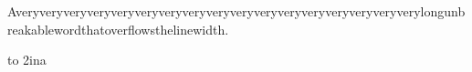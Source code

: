 \documentclass{article}
\begin{document}
Averyveryveryveryveryveryveryveryveryveryveryveryveryveryveryveryverylongunbreakablewordthatoverflowsthelinewidth.

\hbox to 2in{a}
\end{document}
